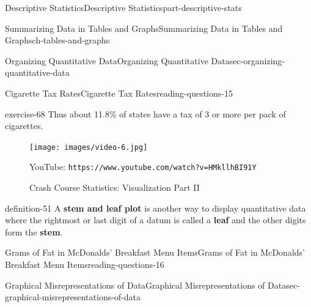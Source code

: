 \documentclass[oneside,10pt,]{book}
\newcommand{\mono}[1]{\texttt{#1}}
\newcommand{\terminology}[1]{\textbf{#1}}
\numberwithin{equation}{section}
\newlength{\qrsize}
\newlength{\previewwidth}
\begin{document}
\begin{partptx}{Descriptive Statistics}{}{Descriptive Statistics}{}{}{part-descriptive-stats}
\begin{chapterptx}{Summarizing Data in Tables and Graphs}{}{Summarizing Data in Tables and Graphs}{}{}{ch-tables-and-graphs}
\begin{sectionptx}{Organizing Quantitative Data}{}{Organizing Quantitative Data}{}{}{sec-organizing-quantitative-data}
\begin{reading-questions-subsection}{Cigarette Tax Rates}{}{Cigarette Tax Rates}{}{}{reading-questions-15}
\begin{divisionexercise}{5}{}{}{exercise-68}
Thus about 11.8\% of states have a tax of \textdollar{}3 or more per pack of cigarettes.%
\end{divisionexercise}%
\end{reading-questions-subsection}
\begin{figure}
\centering
\setlength{\qrsize}{9em}
\setlength{\previewwidth}{\linewidth}
\addtolength{\previewwidth}{-\qrsize}
\begin{tcbraster}[raster columns=2, raster column skip=1pt, raster halign=center, raster force size=false, raster left skip=0pt, raster right skip=0pt]%
\begin{tcolorbox}[previewstyle, width=\previewwidth]%
\texttt{[image: images/video-6.jpg]}%
\end{tcolorbox}%
\begin{tcolorbox}[qrstyle]%
{\hypersetup{urlcolor=black}}%
\end{tcolorbox}%
\begin{tcolorbox}[captionstyle]%
\small YouTube: \mono{https://www.youtube.com/watch?v=HMkllhBI91Y}\end{tcolorbox}%
\end{tcbraster}%
\caption{Crash Course Statistics: Visualization Part II\label{figure-7}}
\end{figure}
\begin{definition}{}{definition-51}%
\hypertarget{p-79}{}%
A \terminology{stem and leaf plot} is another way to display quantitative data where the rightmost or last digit of a datum is called a \terminology{leaf} and the other digits form the \terminology{stem}.%
\end{definition}
%
%
\typeout{************************************************}
\typeout{************************************************}
%
\begin{reading-questions-subsection}{Grams of Fat in McDonalds' Breakfast Menu Items}{}{Grams of Fat in McDonalds' Breakfast Menu Items}{}{}{reading-questions-16}
\hypertarget{p-80}{}%
%
\end{reading-questions-subsection}
\end{sectionptx}
%
%
\typeout{************************************************}
\typeout{************************************************}
%
\begin{sectionptx}{Graphical Misrepresentations of Data}{}{Graphical Misrepresentations of Data}{}{}{sec-graphical-misrepresentations-of-data}

\end{sectionptx}
\end{chapterptx}
\end{partptx}
\end{document}

